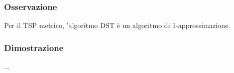 \documentclass[../template]{subfiles}
\begin{document}
\subsubsection{Osservazione}
Per il TSP  metrico, 'algoritmo DST è un algoritmo di 1-approssimazione.
\subsubsection{Dimostrazione}
...
\end{document}
